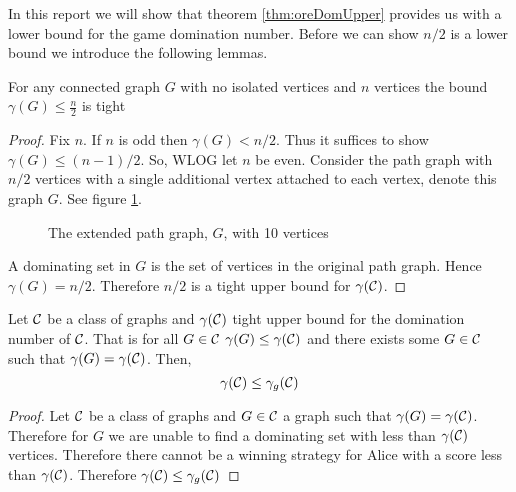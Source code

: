 In this report we will show that theorem \ref{thm:oreDomUpper} provides us with a lower bound for the game domination number.  
Before we can show $n/2$ is a lower bound we introduce the following lemmas. 
\begin{lemma}\label{lem:ore_is_tight}
    For any connected graph $G$ with no isolated vertices and $n$ vertices the bound     
    $\gamma(G) \leq \frac{n}{2}$ is tight
\end{lemma}
\begin{proof}
    Fix $n$. If $n$ is odd then $\gamma(G) < n/2$. Thus it suffices to show $\gamma(G) \leq (n-1)/2$. So, WLOG let $n$ be even. Consider the path graph with $n/2$ vertices with a single additional vertex attached to each vertex, denote this graph $G$. See figure \ref{fig:ext_path}.
    \begin{figure}[H]
        \centering
        \caption{The extended path graph, $G$, with 10 vertices}
        \label{fig:ext_path}
    \end{figure}
    A dominating set in $G$ is the set of vertices in the original path graph. Hence $\gamma(G)= n/2$. Therefore $n/2$ is a tight upper bound for $\gamma(\mathcal{C})$. 
\end{proof}
\begin{lemma}[Askes]\label{thm:domlow}
    Let $\mathcal{C}$ be a class of graphs and $\gamma(\mathcal{C})$ tight upper bound for the domination number of $\mathcal{C}$. That is for all $G\in\mathcal{C}$ $\gamma(G)\leq\gamma(\mathcal{C})$ and there exists some $G\in\mathcal{C}$ such that $\gamma(G)=\gamma(\mathcal{C})$. Then,
    \[\gamma(\mathcal{C}) \leq  \gamma_g(\mathcal{C})\]
\end{lemma}
\begin{proof}
    Let $\mathcal{C}$ be a class of graphs and $G\in\mathcal{C}$ a graph such that $\gamma(G) = \gamma(\mathcal{C})$. 
    Therefore for $G$ we are unable to find a dominating set with less than $ \gamma(\mathcal{C}) $ vertices.
    Therefore there cannot be a winning strategy for Alice with a score less than $\gamma(\mathcal{C})$.
    Therefore $\gamma(\mathcal{C}) \leq \gamma_g(\mathcal{C})$
\end{proof}

